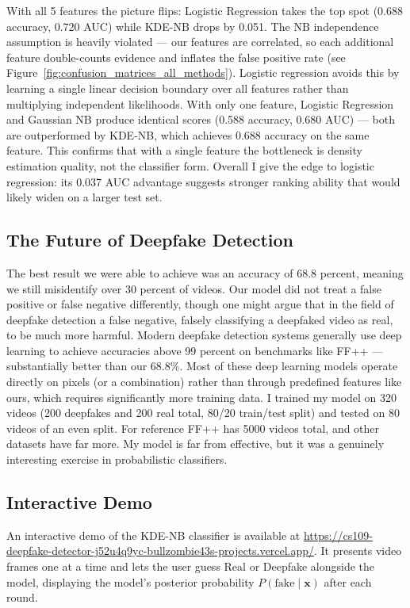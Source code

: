 \documentclass{article}
\begin{document}
With all 5 features the picture flips: Logistic Regression takes the top spot (0.688 accuracy, 0.720 AUC) while KDE-NB drops by 0.051. The NB independence assumption is heavily violated --- our features are correlated, so each additional feature double-counts evidence and inflates the false positive rate (see Figure~\ref{fig:confusion_matrices_all_methods}). Logistic regression avoids this by learning a single linear decision boundary over all features rather than multiplying independent likelihoods. With only one feature, Logistic Regression and Gaussian NB produce identical scores (0.588 accuracy, 0.680 AUC) --- both are outperformed by KDE-NB, which achieves 0.688 accuracy on the same feature. This confirms that with a single feature the bottleneck is density estimation quality, not the classifier form. Overall I give the edge to logistic regression: its 0.037 AUC advantage suggests stronger ranking ability that would likely widen on a larger test set.


\subsection*{The Future of Deepfake Detection}
The best result we were able to achieve was an accuracy of 68.8 percent, meaning we still misidentify over 30 percent of videos. Our model did not treat a false positive or false negative differently, though one might argue that in the field of deepfake detection a false negative, falsely classifying a deepfaked video as real, to be much more harmful. Modern deepfake detection systems generally use deep learning to achieve accuracies above 99 percent on benchmarks like FF++ --- substantially better than our 68.8\%. Most of these deep learning models operate directly on pixels (or a combination) rather than through predefined features like ours, which requires significantly more training data. I trained my model on 320 videos (200 deepfakes and 200 real total, 80/20 train/test split) and tested on 80 videos of an even split. For reference FF++ has 5000 videos total, and other datasets have far more. My model is far from effective, but it was a genuinely interesting exercise in probabilistic classifiers.

\subsection*{Interactive Demo}
An interactive demo of the KDE-NB classifier is available at \url{https://cs109-deepfake-detector-j52u4q9yc-bullzombie43s-projects.vercel.app/}. It presents video frames one at a time and lets the user guess Real or Deepfake alongside the model, displaying the model's posterior probability $P(\text{fake} \mid \mathbf{x})$ after each round.
\end{document}

